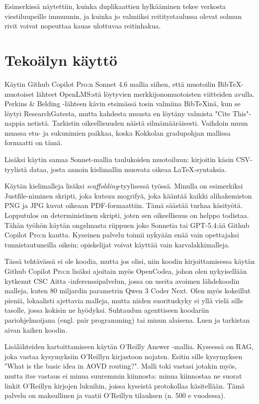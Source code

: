 \documentclass[finnish,utf8,nonumbib,palatino]{KokkolaRaportti}
\begin{document}
Esimerkissä näytettiin, kuinka duplikaattien hylkääminen tekee verkosta viestiluupeille immuunin, ja kuinka jo valmiiksi reititystaulussa olevat solmun rivit voivat nopeuttaa kauas ulottuvaa reitinhakua.


\chapter{Tekoälyn käyttö}

Käytin Github Copilot Pro:n Sonnet 4.6 mallia siihen, että muotoilin BibTeX-muotoiset lähteet OpenLMS:stä löytyvien merkkijonomuotoisten viitteiden avulla. Perkins & Belding -lähteen kävin etsimässä tosin valmiina BibTeXinä, kun se löytyi ResearchGatesta, mutta kahdesta muusta en löytäny valmista "Cite This"-nappia netistä. Tarkistin oikeellisuuden näistä silmämääräisesti. Vaihdoin muun muassa etu- ja sukunimien paikkaa, koska Kokkolan gradupohjan mallissa formaatti on tämä.

Lisäksi käytin samaa Sonnet-mallia taulukoiden muotoiluun: kirjoitin käsin CSV-tyylistä dataa, josta annoin kielimallin muovata oikeaa LaTeX-syntaksia.

Käytän kielimalleja lisäksi \textit{scaffolding}-tyylisessä työssä. Minulla on esimerkiksi Justfile-niminen skripti, joka kutsuu mogrifyä, joka kääntää kaikki alihakemiston PNG ja JPG kuvat oikeaan PDF-formaattiin. Tämä säästää turhaa käsityötä. Lopputulos on deterministinen skripti, joten sen oikeellisuus on helppo todistaa. Tähän työhön käytän ongelmasta riippuen joko Sonnetia tai GPT-5.4:ää Github Copilot Pro:n kautta. Kyseinen palvelu toimii nykyään enää vain opettajaksi tunnistautuneilla oikein; opiskelijat voivat käyttää vain karvalakkimalleja.

Tässä tehtävässä ei ole koodia, mutta jos olisi, niin koodin kirjoittamisessa käytän Github Copilot Pro:n lisäksi ajoitain myös OpenCodea, johon olen nykyisellään kytkenut CSC Aitta -inferenssipalvelun, jossa on useita avoimen lähdekoodin malleja, kuten 80 miljardin parametrin Qwen 3 Coder Next. Olen myös kokeillut pieniä, lokaalisti ajettavia malleja, mutta niiden suorituskyky ei yllä vielä sille tasolle, jossa kokisin ne hyödyksi. Suhtaudun agenttiseen koodariin pariohjelmoijana (engl. pair programming) tai minun alaisena. Luen ja tarkistan aivan kaiken koodin.

Lisälähteiden kartoittamiseen käytän O'Reilly Answer -mallia. Kyseessä on RAG, joka vastaa kysymyksiin O'Reillyn kirjastoon nojaten. Esitin sille kysymyksen "What is the basic idea in AOVD routing?". Malli toki vastasi jotakin myös, mutta itse vastaus ei minua suuremmin kiinnosta: minua kiinnostaa ne suorat linkit O'Reillyn kirjojen lukuihin, joissa kyseistä protokollaa käsitellään. Tämä palvelu on maksullinen ja vaatii O'Reillyn tilauksen (n. 500 e vuodessa).
\end{document}
